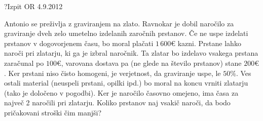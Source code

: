 \begin{naloga}{?}{Izpit OR 4.9.2012}
\begin{vprasanje}
Antonio se preživlja z graviranjem na zlato.
Ravnokar je dobil naročilo za graviranje
dveh zelo umetelno izdelanih zaročnih prstanov.
Če ne uspe izdelati prstanov v dogovorjenem času,
bo moral plačati $1\,600 €$ kazni.
Prstane lahko naroči pri zlatarju, ki ga je izbral naročnik.
Ta zlatar bo izdelavo vsakega prstana zaračunal po $100 €$,
varovana dostava pa (ne glede na število prstanov) stane $200 €$.
Ker prstani niso čisto homogeni,
je verjetnost, da graviranje uspe, le $50 \%$.
Ves ostali material (neuspeli prstani, opilki ipd.)
bo moral na koncu vrniti zlatarju (tako je določeno v pogodbi).
Ker je naročilo časovno omejeno, ima časa za največ 2 naročili pri zlatarju.
Koliko prstanov naj vsakič naroči, da bodo pričakovani stroški čim manjši?
\end{vprasanje}
\begin{odgovor}
\end{odgovor}
\end{naloga}

